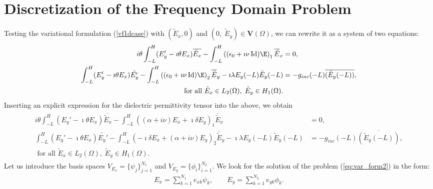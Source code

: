 \section{Discretization of the Frequency Domain Problem}
\label{sec:discr}
Testing the variational formulation (\ref{vf1dcase}) with $(\tilde E_x,0)$ and $(0,\; \tilde{E}_y)\in\mathbf{V}(\Omega)$, we can rewrite it as a system of two equations:
\begin{align*}
\begin{split}
i\theta \displaystyle \int_{-L}^H (E_y' -\imath\theta E_x)\overline{\tilde E_x} - \int_{-L}^H \left((\epsilon_0 +\imath\nu \operatorname{Id}) \E\right)_{1} \overline{\tilde E}_{x}
&=0,\\
\displaystyle \int_{-L}^H (E_y' -\imath\theta E_x)\tilde {E_y'} - \int_{-L}^H\left( (\epsilon_0 +\imath\nu\operatorname{Id}) \E\right)_{2}\overline{\tilde{E}}_{y}
  - \imath \lambda E_y (-L) \tilde E_y (-L) &= -g_{inc} (-L) \overline{( \tilde E_y(-L) )},\\
  \text{ for all } \tilde E_x\in L_{2}(\Omega), \; \tilde{E}_{y}\in H_{1}(\Omega).
  \end{split}
\end{align*}
Inserting an explicit expression for the dielectric permittivity tensor into the above, we obtain
\begin{align}
\label{eq:var_form2}
\begin{split}
 i\theta \displaystyle \int_{-L}^H (E_y' -\imath\theta E_x)\overline{\tilde E_x} - 
 \int_{-L}^H \left((\alpha+i\nu)E_x+\imath\delta E_y\right)_{1} \overline{\tilde E}_{x}
&=0,\\
\int_{-L}^H (E_y' -\imath\theta E_x)\tilde {E_y'} -
\int_{-L}^H\left( -\imath \delta E_x+(\alpha+i\nu) E_y\right)_{2}\overline{\tilde{E}}_{y}
  - \imath \lambda E_y (-L) \tilde E_y (-L) &= -g_{inc} (-L) \overline{( \tilde E_y(-L) )},\\
  \text{ for all } \tilde E_x\in L_{2}(\Omega), \; \tilde{E}_{y}\in H_{1}(\Omega).
  \end{split}
\end{align}
Let us introduce the basis spaces $V_{E_x}=\{\psi_{j}\}_{j=1}^{N_{1}}$ and $V_{E_{y}}=\{\phi_{i}\}_{i=1}^{N_{2}}$. 
We look for the solution of the problem (\ref{eq:var_form2}) in the form:
\begin{align*}
E_x=\sum\limits_{k=1}^{N_{1}}e_{xk}\psi_{k},\qquad E_{y}=\sum\limits_{k=1}^{N_{2}}e_{yk}\phi_{k}.
\end{align*}

